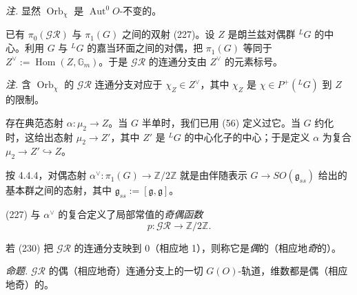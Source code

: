 \emph{注.} 显然 $\operatorname{Orb}_\chi$ 是 $\operatorname{Aut}^0 O$-不变的。

 已有 $\pi_0(\mathcal{GR})$ 与 $\pi_1(G)$ 之间的双射 (227)。设 $Z$ 是朗兰兹对偶群 ${}^LG$ 的中心。利用 $G$ 与 ${}^LG$ 的嘉当环面之间的对偶，把 $\pi_1(G)$ 等同于 $Z^\vee:=\operatorname{Hom}(Z,\mathbb{G}_m)$。于是 $\mathcal{GR}$ 的连通分支由 $Z^\vee$ 的元素标号。

\emph{注.} 含 $\operatorname{Orb}_\chi$ 的 $\mathcal{GR}$ 连通分支对应于 $\chi_Z\in Z^\vee$，其中 $\chi_Z$ 是 $\chi\in P^+({}^LG)$ 到 $Z$ 的限制。

 存在典范态射 $\alpha:\mu_2\to Z$。当 $G$ 半单时，我们已用 (56) 定义过它。当 $G$ 约化时，这给出态射 $\mu_2\to Z'$，其中 $Z'$ 是 ${}^LG$ 的中心化子的中心；于是定义 $\alpha$ 为复合 $\mu_2\to Z'\hookrightarrow Z$。

按 4.4.4，对偶态射 $\alpha^\vee:\pi_1(G)\to\mathbb{Z}/2\mathbb{Z}$ 就是由伴随表示 $G\to SO(\mathfrak{g}_{ss})$ 给出的基本群之间的态射，其中 $\mathfrak{g}_{ss}:=[\mathfrak{g},\mathfrak{g}]$。

(227) 与 $\alpha^\vee$ 的复合定义了局部常值的\emph{奇偶函数}
\begin{equation}\tag{230}
p:\mathcal{GR}\to\mathbb{Z}/2\mathbb{Z}.
\end{equation}

若 (230) 把 $\mathcal{GR}$ 的连通分支映到 0（相应地 1），则称它是\emph{偶}的（相应地\emph{奇}的）。

 \emph{命题.} $\mathcal{GR}$ 的偶（相应地奇）连通分支上的一切 $G(O)$-轨道，维数都是偶（相应地奇）的。
